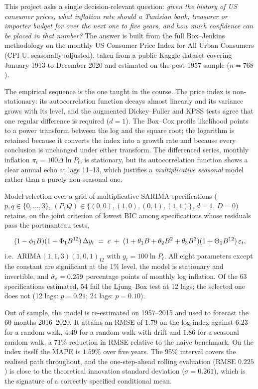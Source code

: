 This project asks a single decision-relevant question: \emph{given the history of US
consumer prices, what inflation rate should a Tunisian bank, treasurer or importer
budget for over the next one to five years, and how much confidence can be placed
in that number?} The answer is built from the full Box--Jenkins methodology on the
monthly US Consumer Price Index for All Urban Consumers (CPI-U, seasonally
adjusted), taken from a public Kaggle dataset covering January 1913 to December
2020 and estimated on the post-1957 sample ($n=768$).

The empirical sequence is the one taught in the course. The price index is
non-stationary: its autocorrelation function decays almost linearly and its
variance grows with its level, and the augmented Dickey--Fuller and KPSS tests
agree that one regular difference is required ($d=1$). The Box--Cox profile
likelihood points to a power transform between the log and the square root; the
logarithm is retained because it converts the index into a growth rate and because
every conclusion is unchanged under either transform. The differenced series,
monthly inflation $\pi_t = 100\Delta\ln P_t$, is stationary, but its autocorrelation
function shows a clear annual echo at lags 11--13, which justifies a
\emph{multiplicative seasonal} model rather than a purely non-seasonal one.

Model selection over a grid of multiplicative SARIMA specifications
($p,q\in\{0,\dots,3\}$, $(P,Q)\in\{(0,0),(1,0),(0,1),(1,1)\}$, $d=1$, $D=0$)
retains, on the joint criterion of lowest BIC among specifications whose residuals
pass the portmanteau tests,

\begin{equation}
(1-\phi_1 B)(1-\Phi_1 B^{12})\,\Delta y_t
\;=\; c \;+\; (1+\theta_1 B+\theta_2 B^2+\theta_3 B^3)(1+\Theta_1 B^{12})\,\varepsilon_t ,
\label{eq:final}
\end{equation}
i.e.\ ARIMA$(1,1,3)(1,0,1)_{12}$ with $y_t=100\ln P_t$. All eight parameters except the constant are significant at
the 1\% level, the model is stationary and invertible, and $\hat\sigma_\varepsilon=0.259$
percentage points of monthly log inflation. Of the 63 specifications estimated,
54 fail the Ljung--Box test at 12 lags; the selected one does not (12 lags:
$p=0.21$; 24 lags: $p=0.10$).

Out of sample, the model is re-estimated on 1957--2015 and used to forecast the
60 months 2016--2020. It attains an RMSE of $1.79$ on the log index against
$6.23$ for a random walk, $4.49$ for a random walk with drift and $1.86$ for a
seasonal random walk, a $71\%$ reduction in RMSE relative to the naive benchmark.
On the index itself the MAPE is $1.59\%$ over five years. The 95\% interval
covers the realised path throughout, and the one-step-ahead rolling evaluation
(RMSE $0.225$) is close to the theoretical innovation standard deviation
($\sigma=0.261$), which is the signature of a correctly specified conditional mean.

